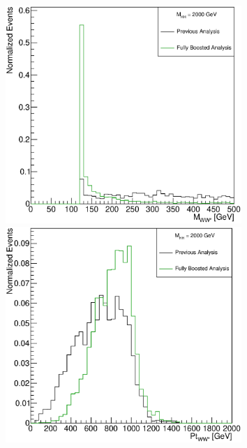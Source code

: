 \documentclass{beamer}
\newcommand*{\header}[1]{\fontsize{16}{8}\selectfont \textbf{{\color{MyPurple}{#1}}}}
\begin{document}
\begin{frame}
\begin{center}
\header{Reconstructed Variables mu-Channel}
\end{center}
\vspace{-0.5cm}
\begin{columns}
\begin{column}{0.5\textwidth}
\begin{center}
\includegraphics[width=0.7\textwidth]{figures/WHad_plots_john_withcuts/muon/hww_m_Xhh2000}\\
\includegraphics[width=0.7\textwidth]{figures/WHad_plots_john_withcuts/muon/hww_pt_Xhh2000}
\end{center}
\end{column}
\begin{column}{0.5\textwidth}
\begin{center}

\end{center}
\end{column}
\end{columns}
\end{frame}
\end{document}
